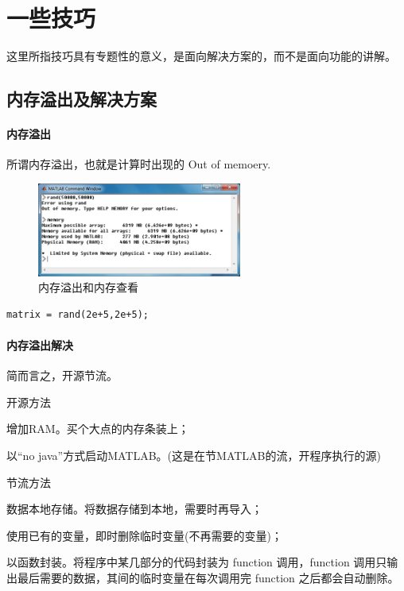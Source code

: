 \section{一些技巧}

这里所指技巧具有专题性的意义，是面向解决方案的，而不是面向功能的讲解。





\subsection{内存溢出及解决方案}

\paragraph{内存溢出}所谓内存溢出，也就是计算时出现的 Out of memoery.

\begin{figure}[htbp]
\includegraphics[width=0.6\textwidth]{diagrams/memoryout}
\caption{内存溢出和内存查看}
\end{figure}

\vspace{-0.8cm}
\begin{lstlisting}[caption = 生成随机矩阵]
  matrix = rand(2e+5,2e+5);
\end{lstlisting}



\paragraph{内存溢出解决} 简而言之，开源节流。

\begindot
  \item 开源方法
    \begin{itemize*}
    \item 增加RAM。买个大点的内存条装上；
    \item 以“no java”方式启动MATLAB。(这是在节MATLAB的流，开程序执行的源)
    \end{itemize*}
  \item 节流方法
    \begin{itemize*}
    \item 数据本地存储。将数据存储到本地，需要时再导入；
    \item 使用已有的变量，即时删除临时变量(不再需要的变量)；
    \item 以函数封装。将程序中某几部分的代码封装为 function 调用，function 调用只输出最后需要的数据，其间的临时变量在每次调用完 function 之后都会自动删除。
    \end{itemize*}
\myenddot






